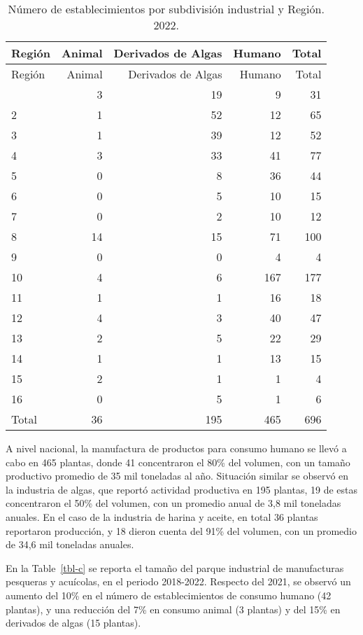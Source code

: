 \documentclass[
  super,
  preprint,
  3p]{elsarticle}
\begin{document}
\hypertarget{tbl-b}{}
\begin{longtable}[]{@{}lrrrr@{}}
\caption{\label{tbl-b}Número de establecimientos por subdivisión
industrial y Región. 2022.}\tabularnewline
\toprule\noalign{}
Región & Animal & Derivados de Algas & Humano & Total \\
\midrule\noalign{}
\endfirsthead
\toprule\noalign{}
Región & Animal & Derivados de Algas & Humano & Total \\
\midrule\noalign{}
\endhead
\bottomrule\noalign{}
\endlastfoot
1 & 3 & 19 & 9 & 31 \\
2 & 1 & 52 & 12 & 65 \\
3 & 1 & 39 & 12 & 52 \\
4 & 3 & 33 & 41 & 77 \\
5 & 0 & 8 & 36 & 44 \\
6 & 0 & 5 & 10 & 15 \\
7 & 0 & 2 & 10 & 12 \\
8 & 14 & 15 & 71 & 100 \\
9 & 0 & 0 & 4 & 4 \\
10 & 4 & 6 & 167 & 177 \\
11 & 1 & 1 & 16 & 18 \\
12 & 4 & 3 & 40 & 47 \\
13 & 2 & 5 & 22 & 29 \\
14 & 1 & 1 & 13 & 15 \\
15 & 2 & 1 & 1 & 4 \\
16 & 0 & 5 & 1 & 6 \\
Total & 36 & 195 & 465 & 696 \\
\end{longtable}

A nivel nacional, la manufactura de productos para consumo humano se
llevó a cabo en 465 plantas, donde 41 concentraron el 80\% del volumen,
con un tamaño productivo promedio de 35 mil toneladas al año. Situación
similar se observó en la industria de algas, que reportó actividad
productiva en 195 plantas, 19 de estas concentraron el 50\% del volumen,
con un promedio anual de 3,8 mil toneladas anuales. En el caso de la
industria de harina y aceite, en total 36 plantas reportaron producción,
y 18 dieron cuenta del 91\% del volumen, con un promedio de 34,6 mil
toneladas anuales.

En la Table~\ref{tbl-c} se reporta el tamaño del parque industrial de
manufacturas pesqueras y acuícolas, en el periodo 2018-2022. Respecto
del 2021, se observó un aumento del 10\% en el número de
establecimientos de consumo humano (42 plantas), y una reducción del 7\%
en consumo animal (3 plantas) y del 15\% en derivados de algas (15
plantas).
\end{document}
